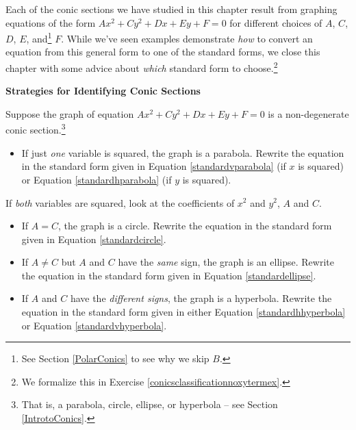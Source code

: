 \documentclass{ximera}
\begin{document}
Each of the conic sections we have studied in this chapter result from graphing equations of the form $Ax^2 + Cy^2 + Dx + Ey + F = 0$ for different choices of $A$, $C$, $D$, $E$, and\footnote{See Section \ref{PolarConics} to see why we skip $B$.} $F$. While we've seen examples demonstrate \textit{how} to convert an equation from this general form to one of the standard forms, we close this chapter with some advice about \textit{which} standard form to choose.\footnote{We formalize this in Exercise \ref{conicsclassificationnoxytermex}.}



\label{idconocsrulesofthumb}

\centerline{\textbf{Strategies for Identifying Conic Sections}}



Suppose the graph of  equation $Ax^2 + Cy^2 + Dx + Ey + F = 0$ is a non-degenerate conic section.\footnote{That is, a parabola, circle, ellipse, or hyperbola -- see Section \ref{IntrotoConics}.}

\begin{itemize}

\item  If just \textit{one} variable is squared, the graph is a parabola.  Rewrite the equation in the standard form given in  Equation \ref{standardvparabola} (if $x$ is squared)  or Equation \ref{standardhparabola} (if $y$ is squared).

\end{itemize}

If \textit{both} variables are squared, look at the coefficients of $x^2$ and $y^2$, $A$ and $C$.

\begin{itemize}

\item  If $A=C$, the graph is a circle.  Rewrite the equation in the standard form given in  Equation \ref{standardcircle}.

\item If $A \neq C$ but $A$ and $C$ have the \textit{same} sign, the graph is an ellipse. Rewrite the equation in the standard form given in  Equation \ref {standardellipse}.


\item   If  $A$ and $C$ have the \textit{different signs}, the graph is a hyperbola. Rewrite the equation in the standard form given in either Equation \ref{standardhhyperbola} or Equation \ref{standardvhyperbola}.

\end{itemize}



\closegraphsfile
\end{document}

